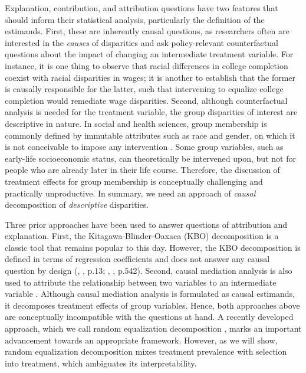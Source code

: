 \documentclass[12pt,a4paper]{article}
\begin{document}
Explanation, contribution, and attribution questions have two features that should inform their statistical analysis, particularly the definition of the estimands. First, these
are inherently causal questions, as researchers often are interested in the \emph{causes} of disparities and ask policy-relevant counterfactual questions about the impact of changing an intermediate treatment variable. For instance, it is one thing to observe that racial differences in college completion coexist with racial disparities in wages; it is another to establish that the former is causally responsible for the latter, such that intervening to equalize college completion would remediate wage disparities. Second, although counterfactual analysis is needed for the treatment variable, the group disparities of interest are descriptive in nature. In social and health sciences, group membership is commonly defined by immutable attributes such as race and gender, on which it is not conceivable to impose any intervention \citep{rubin_estimating_1974, holland_statistics_1986, berzuini_causal_2012}. Some group variables, such as early-life socioeconomic status, can theoretically be intervened upon, but not for people who are already later in their life course. Therefore, the discussion of treatment effects for group membership is conceptually challenging and practically unproductive.  In summary, we need an approach of \emph{causal} decomposition of \emph{descriptive} disparities. 

Three prior approaches have been used to answer questions of attribution and explanation.
First, the Kitagawa-Blinder-Oaxaca (KBO) decomposition \citep{kitagawa_components_1955, blinder_wage_1973, oaxaca_male-female_1973} is a classic tool that remains popular to this day. 
However, the KBO decomposition is defined in terms of regression coefficients and does not answer any causal question by design (\citeauthor{fortin_decomposition_2011}, \citeyear{fortin_decomposition_2011}, p.13; \citeauthor{lundberg_what_2021}, \citeyear{lundberg_what_2021}, p.542). Second, causal mediation analysis is also used to attribute the relationship between two variables to an intermediate variable \citep{vanderweele_explanation_2015}. Although causal mediation analysis is formulated as causal estimands, it decomposes treatment effects of group variables. Hence, both approaches above are conceptually incompatible with the questions at hand. A recently developed  approach, which we call random equalization decomposition \citep{vanderweele_causal_2014, jackson_decomposition_2018, lundberg_gap-closing_2022}, marks an important advancement towards an appropriate framework. However, as we will show, random equalization decomposition mixes treatment prevalence with selection into treatment, which ambiguates its interpretability.
\end{document}
